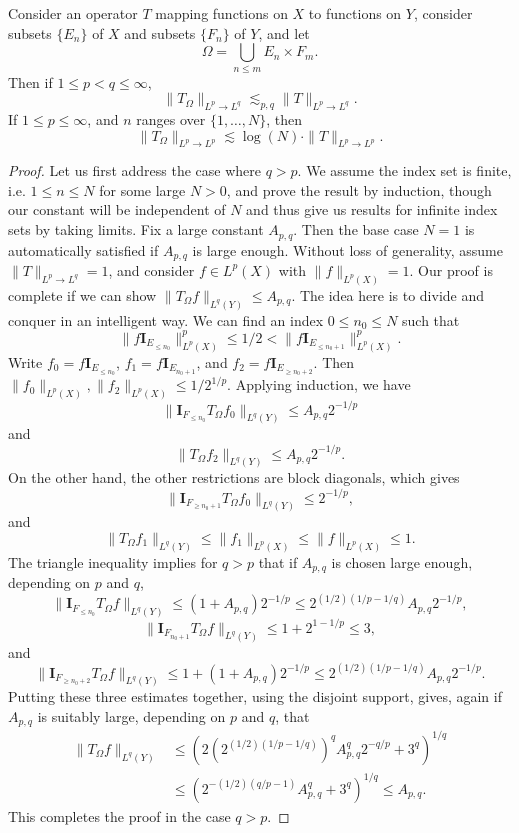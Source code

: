 \begin{theorem}
    Consider an operator $T$ mapping functions on $X$ to functions on $Y$, consider subsets $\{ E_n \}$ of $X$ and subsets $\{ F_n \}$ of $Y$, and let
    \[ \Omega = \bigcup_{n \leq m} E_n \times F_m. \]
    Then if $1 \leq p < q \leq \infty$,
    \[ \| T_\Omega \|_{L^p \to L^q} \lesssim_{p,q} \| T \|_{L^p \to L^q}. \]
    If $1 \leq p \leq \infty$, and $n$ ranges over $\{ 1, \dots, N \}$, then
    \[ \| T_\Omega \|_{L^p \to L^p} \lesssim \log(N) \cdot \| T \|_{L^p \to L^p}. \]
\end{theorem}
\begin{proof}
    Let us first address the case where $q > p$. We assume the index set is finite, i.e. $1 \leq n \leq N$ for some large $N > 0$, and prove the result by induction, though our constant will be independent of $N$ and thus give us results for infinite index sets by taking limits. Fix a large constant $A_{p,q}$. Then the base case $N = 1$ is automatically satisfied if $A_{p,q}$ is large enough. Without loss of generality, assume $\| T \|_{L^p \to L^q} = 1$, and consider $f \in L^p(X)$ with $\| f \|_{L^p(X)} = 1$. Our proof is complete if we can show $\| T_\Omega f \|_{L^q(Y)} \leq A_{p,q}$. The idea here is to divide and conquer in an intelligent way. We can find an index $0 \leq n_0 \leq N$ such that
    \[ \| f \mathbf{I}_{E_{\leq n_0}} \|_{L^p(X)}^p \leq 1/2 < \| f \mathbf{I}_{E_{\leq n_0 + 1}} \|_{L^p(X)}^p. \]
    Write $f_0 = f \mathbf{I}_{E_{\leq n_0}}$, $f_1 = f \mathbf{I}_{E_{n_0 + 1}}$, and $f_2 = f \mathbf{I}_{E_{\geq n_0 + 2}}$. Then $\| f_0 \|_{L^p(X)}, \| f_2 \|_{L^p(X)} \leq 1/2^{1/p}$. Applying induction, we have
    \[ \| \mathbf{I}_{F_{\leq n_0}} T_\Omega f_0 \|_{L^q(Y)} \leq A_{p,q} 2^{-1/p} \]
    and
    \[ \| T_\Omega f_2 \|_{L^q(Y)} \leq A_{p,q} 2^{-1/p}. \]
    On the other hand, the other restrictions are block diagonals, which gives
    \[ \| \mathbf{I}_{F_{\geq n_0 + 1}} T_\Omega f_0 \|_{L^q(Y)} \leq 2^{-1/p}, \]
    and
    \[ \| T_\Omega f_1 \|_{L^q(Y)} \leq \| f_1 \|_{L^p(X)} \leq \| f \|_{L^p(X)} \leq 1. \]
    The triangle inequality implies for $q > p$ that if $A_{p,q}$ is chosen large enough, depending on $p$ and $q$,
    \[ \| \mathbf{I}_{F_{\leq n_0}} T_\Omega f \|_{L^q(Y)} \leq (1 + A_{p,q}) 2^{-1/p} \leq 2^{(1/2)(1/p - 1/q)} A_{p,q} 2^{-1/p}, \]
    \[ \| \mathbf{I}_{F_{n_0 + 1}} T_\Omega f \|_{L^q(Y)} \leq 1 + 2^{1-1/p} \leq 3, \]
    and
    \[ \| \mathbf{I}_{F_{\geq n_0 + 2}} T_\Omega f \|_{L^q(Y)} \leq 1 + (1 + A_{p,q}) 2^{-1/p} \leq 2^{(1/2)(1/p - 1/q)} A_{p,q} 2^{-1/p}. \]
    Putting these three estimates together, using the disjoint support, gives, again if $A_{p,q}$ is suitably large, depending on $p$ and $q$, that
    \begin{align*}
        \| T_\Omega f \|_{L^q(Y)} &\leq ( 2 (2^{(1/2)(1/p - 1/q)})^q A_{p,q}^q 2^{-q/p} + 3^q )^{1/q}\\
        &\leq ( 2^{-(1/2)(q/p - 1)} A_{p,q}^q + 3^q )^{1/q} \leq A_{p,q}.
    \end{align*}
    This completes the proof in the case $q > p$.


\end{proof}
